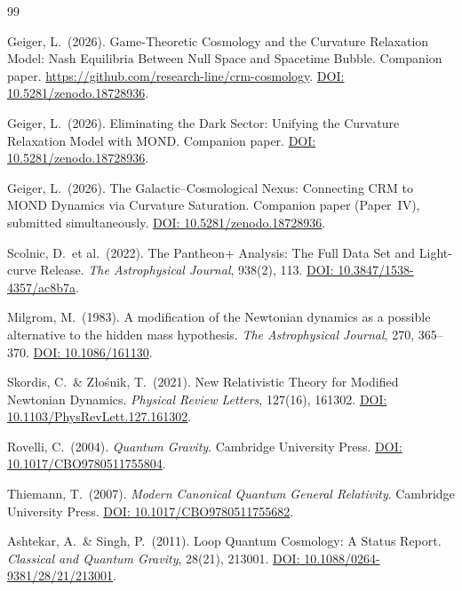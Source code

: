 \documentclass[aps,prd,twocolumn,superscriptaddress,nofootinbib]{revtex4-2}
\begin{document}
\begin{thebibliography}{99}

Geiger, L.\ (2026).
Game-Theoretic Cosmology and the Curvature Relaxation Model: Nash Equilibria Between Null Space and Spacetime Bubble.
Companion paper. \url{https://github.com/research-line/crm-cosmology}.
\href{https://doi.org/10.5281/zenodo.18728936}{DOI: 10.5281/zenodo.18728936}.

Geiger, L.\ (2026).
Eliminating the Dark Sector: Unifying the Curvature Relaxation Model with MOND.
Companion paper.
\href{https://doi.org/10.5281/zenodo.18728936}{DOI: 10.5281/zenodo.18728936}.

Geiger, L.\ (2026).
The Galactic--Cosmological Nexus: Connecting CRM to MOND Dynamics via Curvature Saturation.
Companion paper (Paper~IV), submitted simultaneously.
\href{https://doi.org/10.5281/zenodo.18728936}{DOI: 10.5281/zenodo.18728936}.

Scolnic, D.\ et al.\ (2022).
The Pantheon+ Analysis: The Full Data Set and Light-curve Release.
\textit{The Astrophysical Journal}, 938(2), 113.
\href{https://doi.org/10.3847/1538-4357/ac8b7a}{DOI: 10.3847/1538-4357/ac8b7a}.

Milgrom, M.\ (1983).
A modification of the Newtonian dynamics as a possible alternative to the hidden mass hypothesis.
\textit{The Astrophysical Journal}, 270, 365--370.
\href{https://doi.org/10.1086/161130}{DOI: 10.1086/161130}.

Skordis, C.\ \& Z{\l}o\'snik, T.\ (2021).
New Relativistic Theory for Modified Newtonian Dynamics.
\textit{Physical Review Letters}, 127(16), 161302.
\href{https://doi.org/10.1103/PhysRevLett.127.161302}{DOI: 10.1103/PhysRevLett.127.161302}.

Rovelli, C.\ (2004).
\textit{Quantum Gravity}. Cambridge University Press.
\href{https://doi.org/10.1017/CBO9780511755804}{DOI: 10.1017/CBO9780511755804}.

Thiemann, T.\ (2007).
\textit{Modern Canonical Quantum General Relativity}. Cambridge University Press.
\href{https://doi.org/10.1017/CBO9780511755682}{DOI: 10.1017/CBO9780511755682}.

Ashtekar, A.\ \& Singh, P.\ (2011).
Loop Quantum Cosmology: A Status Report.
\textit{Classical and Quantum Gravity}, 28(21), 213001.
\href{https://doi.org/10.1088/0264-9381/28/21/213001}{DOI: 10.1088/0264-9381/28/21/213001}.


\end{thebibliography}
\end{document}
